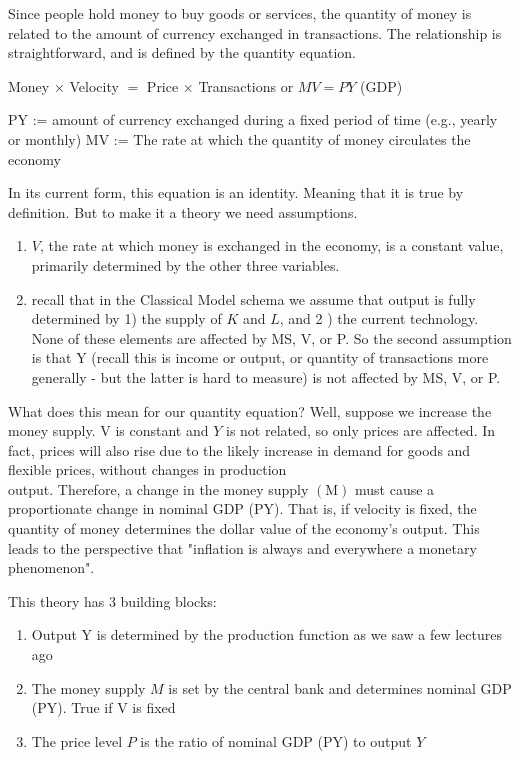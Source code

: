 \documentclass[10pt]{article}
\begin{document}
Since people hold money to buy goods or services, the quantity of money is related to the amount of currency exchanged in transactions. The relationship is straightforward, and is defined by the quantity equation.

Money $\times$ Velocity $=$ Price $\times$ Transactions or $M V=P Y$ (GDP)

PY := amount of currency exchanged during a fixed period of time (e.g., yearly or monthly) MV := The rate at which the quantity of money circulates the economy

In its current form, this equation is an identity. Meaning that it is true by definition. But to make it a theory we need assumptions.

\begin{enumerate}
  \item $V$, the rate at which money is exchanged in the economy, is a constant value, primarily determined by the other three variables.
  \item recall that in the Classical Model schema we assume that output is fully determined by 1) the supply of $K$ and $L$, and 2 ) the current technology. None of these elements are affected by MS, V, or P. So the second assumption is that Y (recall this is income or output, or quantity of transactions more generally - but the latter is hard to measure) is not affected by MS, V, or P.
\end{enumerate}

What does this mean for our quantity equation? Well, suppose we increase the money supply. V is constant and $Y$ is not related, so only prices are affected. In fact, prices will also rise due to the likely increase in demand for goods and flexible prices, without changes in production\\
output. Therefore, a change in the money supply $(\mathrm{M})$ must cause a proportionate change in nominal GDP (PY). That is, if velocity is fixed, the quantity of money determines the dollar value of the economy's output. This leads to the perspective that "inflation is always and everywhere a monetary phenomenon".

This theory has 3 building blocks:

\begin{enumerate}
  \item Output Y is determined by the production function as we saw a few lectures ago
  \item The money supply $M$ is set by the central bank and determines nominal GDP (PY). True if V is fixed
  \item The price level $P$ is the ratio of nominal GDP (PY) to output $Y$
\end{enumerate}
\end{document}
